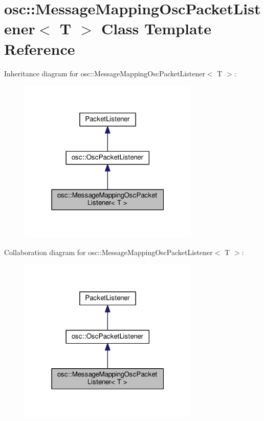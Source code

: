 \hypertarget{classosc_1_1_message_mapping_osc_packet_listener}{}\section{osc\+:\+:Message\+Mapping\+Osc\+Packet\+Listener$<$ T $>$ Class Template Reference}
\label{classosc_1_1_message_mapping_osc_packet_listener}


Inheritance diagram for osc\+:\+:Message\+Mapping\+Osc\+Packet\+Listener$<$ T $>$\+:\nopagebreak
\begin{figure}[H]
\begin{center}
\leavevmode
\includegraphics[width=244pt]{classosc_1_1_message_mapping_osc_packet_listener__inherit__graph}
\end{center}
\end{figure}


Collaboration diagram for osc\+:\+:Message\+Mapping\+Osc\+Packet\+Listener$<$ T $>$\+:\nopagebreak
\begin{figure}[H]
\begin{center}
\leavevmode
\includegraphics[width=244pt]{classosc_1_1_message_mapping_osc_packet_listener__coll__graph}
\end{center}
\end{figure}
